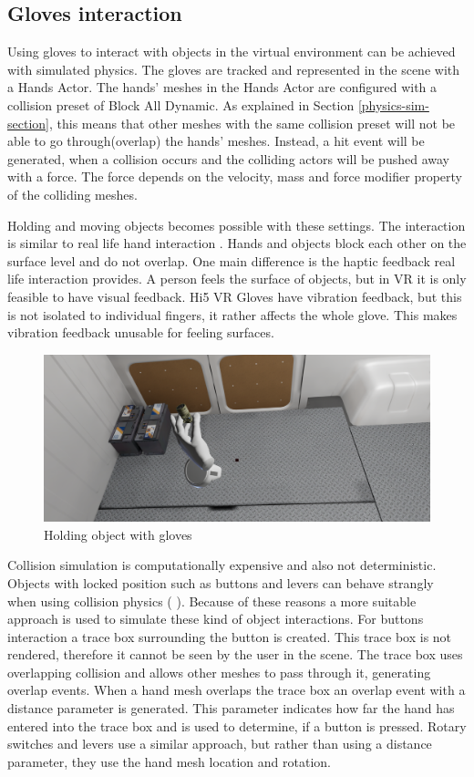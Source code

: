 \documentclass[12pt, a4paper,oneside, nocenter]{thesis}
\newcommand{\citeyearxamk}[1]{(\citeauthor{#1} \citeyear{#1})}
\begin{document}
\subsection{Gloves interaction}
Using gloves to interact with objects in the virtual environment can be achieved with simulated physics. The gloves are tracked and represented in the scene with a Hands Actor. The hands' meshes in the Hands Actor are configured with a collision preset of Block All Dynamic. As explained in Section \ref{physics-sim-section}, this means that other meshes with the same collision preset will not be able to go through(overlap) the hands' meshes. Instead, a hit event will be generated, when a collision occurs and the colliding actors will be pushed away with a force. The force depends on the velocity, mass and force modifier property of the colliding meshes.
\par
Holding and moving objects becomes possible with these settings. The interaction is similar to real life hand interaction . Hands and objects block each other on the surface level and do not overlap. One main difference is the haptic feedback real life interaction provides. A person feels the surface of objects, but in VR it is only feasible to have visual feedback. Hi5 VR Gloves have vibration feedback, but this is not isolated to individual fingers, it rather affects the whole glove. This makes vibration feedback unusable for feeling surfaces.
\begin{figure}[H]
	\includegraphics[width=\textwidth]{gloves-grab}
	\caption{Holding object with gloves}
	\label{fig:gloves-grab}
\end{figure}
\par
 Collision simulation is computationally expensive and also not deterministic. Objects with locked position such as buttons and levers can behave strangly when using collision physics \citeyearxamk{collaborative-vr}. Because of these reasons a more suitable approach is used to simulate these kind of object interactions. For buttons interaction a trace box surrounding the button is created. This trace box is not rendered, therefore it cannot be seen by the user in the scene. The trace box uses overlapping collision and allows other meshes to pass through it, generating overlap events. When a hand mesh overlaps the trace box an overlap event with a distance parameter is generated. This parameter indicates how far the hand has entered into the trace box and is used to determine, if a button is pressed. Rotary switches and levers use a similar approach, but rather than using a distance parameter, they use the hand mesh location and rotation.
\end{document}
